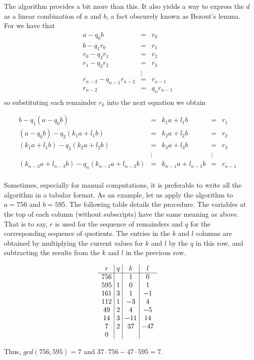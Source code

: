 \documentclass[12pt]{article}
\theoremstyle{definition}
\theoremstyle{definition}
\theoremstyle{definition}
\begin{document}
The algorithm provides a bit more than this.  It also yields a way to express the $d$ as a linear
combination of $a$ and $b$, a fact obscurely known as Bezout's lemma.  For we have that
\begin{eqnarray*}
  a  -q_0b    &=&  r_0    \\
  b  -q_1r_0  &=&   r_1   \\
  r_0 - q_2r_1 &=& r_2    \\
  r_1 - q_3r_2 &=& r_3    \\
      &\vdots&            \\
  r_{n-3} - q_{n-1}r_{n-2} &=& r_{n-1}  \\
  r_{n-2} &=& q_nr_{n-1} \\
\end{eqnarray*}
so substituting each remainder $r_k$ into the next equation we obtain 
\begin{table}[ht]
\[
\begin{array}{ccccc}
  b                     - q_1(a - q_0b)    &=& k_1a + l_1b &=& r_1 \\
  (a - q_0b)            - q_2(k_1a + l_1b) &=& k_2a + l_2b &=& r_2 \\
  (k_1a + l_1b)         - q_3(k_2a + l_2b) &=& k_3a + l_3b &=& r_3  \\
                                       &\vdots &        &\vdots&   \\
  (k_{n-3}a + l_{n-3}b) - q_n(k_{n-2}a + l_{n-2}b) &=& k_{n-1} a + l_{n-1} b &=& r_{n-1} \\
\end{array}
\]
\end{table}

Sometimes, especially for manual computations, it is preferable to write  all the algorithm in a tabular
format.  As an example, let us apply the algorithm to $a=756$ and $b=595$.  The following table details
the procedure. The variables at the top of each column (without subscripts) have the same meaning as above.
That is to say, $r$ is used for the sequence of remainders and $q$ for the corresponding sequence of 
quotients.  The entries in the $k$ and $l$ columns are obtained by multiplying the current values for $k$
and $l$ by the $q$ in this row, and subtracting the results from the $k$ and $l$ in the previous row.

\begin{table}[h]
\[
\begin{array}{c@{~\vline~}c@{~\vline~}c@{~\vline~}c} 
  r   & q  & k  &  l \\
\hline
 756  &    &    1 &    0   \\
 595  & 1  &    0 &    1   \\
 161  & 3  &    1 &   -1   \\
 112  & 1  &   -3 &    4   \\
  49  & 2  &    4 &   -5   \\
  14  & 3  &  -11 &   14   \\
   7  & 2  &   37 &  -47   \\
   0  &    &      &        \\
\end{array}
\]
\end{table}
Thus, $gcd(756, 595) = 7$ and $37 \cdot 756 - 47 \cdot 595 = 7$.
\end{document}
